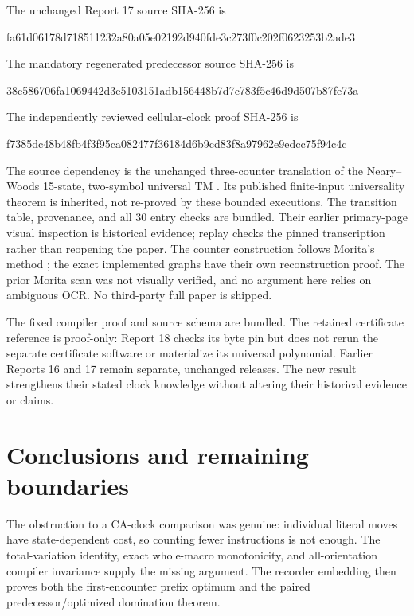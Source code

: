 \documentclass[11pt,a4paper]{article}
\numberwithin{equation}{section}
\begin{document}
The unchanged Report 17 source SHA-256 is
\begin{center}\small\ttfamily
fa61d06178d718511232a80a05e02192d940fde3c273f0c202f0623253b2ade3
\end{center}
The mandatory regenerated predecessor source SHA-256 is
\begin{center}\small\ttfamily
38c586706fa1069442d3e5103151adb156448b7d7c783f5c46d9d507b87fe73a
\end{center}
The independently reviewed cellular-clock proof SHA-256 is
\begin{center}\small\ttfamily
f7385dc48b48fb4f3f95ca082477f36184d6b9cd83f8a97962e9edcc75f94c4c
\end{center}

The source dependency is the unchanged three-counter translation of the
Neary--Woods 15-state, two-symbol universal TM \cite{fpa:nw}.
Its published finite-input universality theorem is inherited, not re-proved
by these bounded executions. The transition table, provenance, and all
30 entry checks are bundled. Their earlier primary-page visual inspection
is historical evidence; replay checks the pinned transcription rather than
reopening the paper. The counter construction follows Morita's method
\cite{fpa:morita1996}; the exact implemented graphs have their own reconstruction
proof. The prior Morita scan was not visually verified, and no argument
here relies on ambiguous OCR. No third-party full paper is shipped.

The fixed compiler proof and source schema are bundled. The retained
certificate reference is proof-only: Report 18 checks its byte pin but
does not rerun the separate certificate software or materialize its
universal polynomial. Earlier Reports 16 and 17 remain separate, unchanged
releases. The new result strengthens their stated clock knowledge without
altering their historical evidence or claims.
\newpage

\section{Conclusions and remaining boundaries}\label{fpa:rep:18:last}
The obstruction to a CA-clock comparison was genuine: individual literal
moves have state-dependent cost, so counting fewer instructions is not
enough. The total-variation identity, exact whole-macro monotonicity, and
all-orientation compiler invariance supply the missing argument. The
recorder embedding then proves both the first-encounter prefix optimum and
the paired predecessor/optimized domination theorem.
\end{document}
